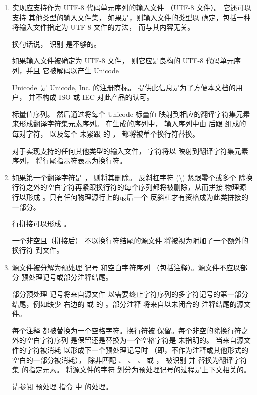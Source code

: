 \begin{enumerate}
\item
{}%
实现应支持作为 UTF-8 代码单元序列的输入文件
（UTF-8 文件）。
它还可以支持
 其他类型的输入文件集，
如果是，则输入文件的类型以
确定，包括一种将输入文件指定为 UTF-8 文件的方法，
而与其内容无关。
\begin{note}
换句话说，
识别  是不够的。
\end{note}
如果输入文件被确定为 UTF-8 文件，
则它应是良构的 UTF-8 代码单元序列，并且
它被解码以产生 Unicode
\begin{footnote}
Unicode\textregistered\ 是 Unicode, Inc. 的注册商标。
提供此信息是为了方便本文档的用户，
并不构成 ISO 或 IEC 对此产品的认可。
\end{footnote}
标量值序列。
然后通过将每个 Unicode 标量值
映射到相应的翻译字符集元素来形成翻译字符集元素序列。
在生成的序列中，
输入序列中由
 后跟  组成的每对字符，
以及每个
未紧跟  的 ，
都将被单个换行符替换。

对于实现支持的任何其他类型的输入文件，
字符将以
映射到翻译字符集元素序列，
将行尾指示符表示为换行符。

\item
{}%
如果第一个翻译字符是 ，
则将其删除。
反斜杠字符 (\textbackslash)
紧跟零个或多个
除换行符之外的空白字符再紧跟换行符的每个序列都将被删除，从而拼接
物理源行以形成 。只有任何物理源行上的最后一个
反斜杠才有资格成为此类拼接的一部分。
\begin{note}
行拼接可以形成
。
\end{note}
一个非空且（拼接后）
不以换行符结尾的源文件
将被视为附加了一个额外的换行符
到文件。

\item 源文件被分解为预处理
记号 和空白字符序列
（包括注释）。源文件不应以部分
预处理记号或部分注释结尾。
\begin{footnote}
部分预处理
记号将来自源文件
以需要终止字符序列的多字符记号的第一部分结尾，例如缺少
右边的 
或 \tcode{>} 的 。部分注释
将来自以未闭合的 \tcode{/*}
注释结尾的源文件。
\end{footnote}
每个注释 都被替换为一个空格字符。换行符被
保留。每个非空的除换行符之外的空白字符序列
是保留还是替换为一个空格字符是
未指明的。
当来自源文件的字符被消耗
以形成下一个预处理记号时
（即，不作为注释或其他形式的空白的一部分被消耗），
除非匹配
、
、
、
 或
，
 被识别 并
替换为翻译字符集 的指定元素。
将源文件的字符
划分为预处理记号的过程是上下文相关的。
\begin{example}
请参阅  预处理
指令 中 \tcode{<} 的处理。
\end{example}


\end{enumerate}
